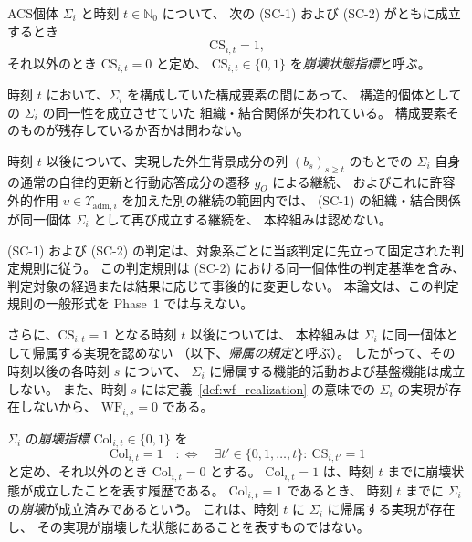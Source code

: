 \begin{definition}[崩壊状態指標と崩壊指標]
\label{def:collapse}
ACS個体 $\Sigma_i$ と時刻 $t\in\mathbb{N}_0$ について、
次の (SC-1) および (SC-2) がともに成立するとき
\[
  \mathrm{CS}_{i,t}=1,
\]
それ以外のとき $\mathrm{CS}_{i,t}=0$ と定め、
$\mathrm{CS}_{i,t}\in\{0,1\}$ を\emph{崩壊状態指標}と呼ぶ。

\begin{description}[style=nextline]
  \item[(SC-1) 構造的同一性を成立させる組織関係の喪失]
  時刻 $t$ において、$\Sigma_i$ を構成していた構成要素の間にあって、
  構造的個体としての $\Sigma_i$ の同一性を成立させていた
  組織・結合関係が失われている。
  構成要素そのものが残存しているか否かは問わない。
  \item[(SC-2) 本枠組みに相対する同一個体としての非回復性]
  時刻 $t$ 以後について、実現した外生背景成分の列 $(b_s)_{s\geq t}$ のもとでの
  $\Sigma_i$ 自身の通常の自律的更新と行動応答成分の遷移 $g_O$ による継続、
  およびこれに許容外的作用 $\upsilon\in\Upsilon_{\mathrm{adm},i}$ を加えた別の継続の範囲内では、
  (SC-1) の組織・結合関係が同一個体 $\Sigma_i$ として再び成立する継続を、
  本枠組みは認めない。
\end{description}

(SC-1) および (SC-2) の判定は、対象系ごとに当該判定に先立って固定された判定規則に従う。
この判定規則は (SC-2) における同一個体性の判定基準を含み、
判定対象の経過または結果に応じて事後的に変更しない。
本論文は、この判定規則の一般形式を Phase~1 では与えない。

さらに、$\mathrm{CS}_{i,t}=1$ となる時刻 $t$ 以後については、
本枠組みは $\Sigma_i$ に同一個体として帰属する実現を認めない
（以下、\emph{帰属の規定}と呼ぶ）。
したがって、その時刻以後の各時刻 $s$ について、
$\Sigma_i$ に帰属する機能的活動および基盤機能は成立しない。
また、時刻 $s$ には定義~\ref{def:wf_realization} の意味での $\Sigma_i$ の実現が存在しないから、
$\mathrm{WF}_{i,s}=0$ である。

$\Sigma_i$ の\emph{崩壊指標} $\mathrm{Col}_{i,t}\in\{0,1\}$ を
\[
  \mathrm{Col}_{i,t}=1
  \quad:\Longleftrightarrow\quad
  \exists t'\in\{0,1,\ldots,t\}:\ \mathrm{CS}_{i,t'}=1
\]
と定め、それ以外のとき $\mathrm{Col}_{i,t}=0$ とする。
$\mathrm{Col}_{i,t}=1$ は、時刻 $t$ までに崩壊状態が成立したことを表す履歴である。
$\mathrm{Col}_{i,t}=1$ であるとき、
時刻 $t$ までに $\Sigma_i$ の\emph{崩壊}が成立済みであるという。
これは、時刻 $t$ に $\Sigma_i$ に帰属する実現が存在し、
その実現が崩壊した状態にあることを表すものではない。
\end{definition}

